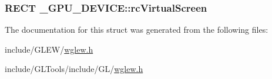 \hypertarget{struct___g_p_u___d_e_v_i_c_e_aeb573bbeb3b6c589246720ef259b9a27}{
\subsubsection[{rc\-Virtual\-Screen}]{\setlength{\rightskip}{0pt plus 5cm}R\-E\-C\-T \-\_\-\-G\-P\-U\-\_\-\-D\-E\-V\-I\-C\-E\-::rc\-Virtual\-Screen}}\label{struct___g_p_u___d_e_v_i_c_e_aeb573bbeb3b6c589246720ef259b9a27}


The documentation for this struct was generated from the following files\-:\begin{DoxyCompactItemize}
\item 
include/\-G\-L\-E\-W/\hyperlink{_g_l_e_w_2wglew_8h}{wglew.\-h}\item 
include/\-G\-L\-Tools/include/\-G\-L/\hyperlink{_g_l_tools_2include_2_g_l_2wglew_8h}{wglew.\-h}\end{DoxyCompactItemize}
